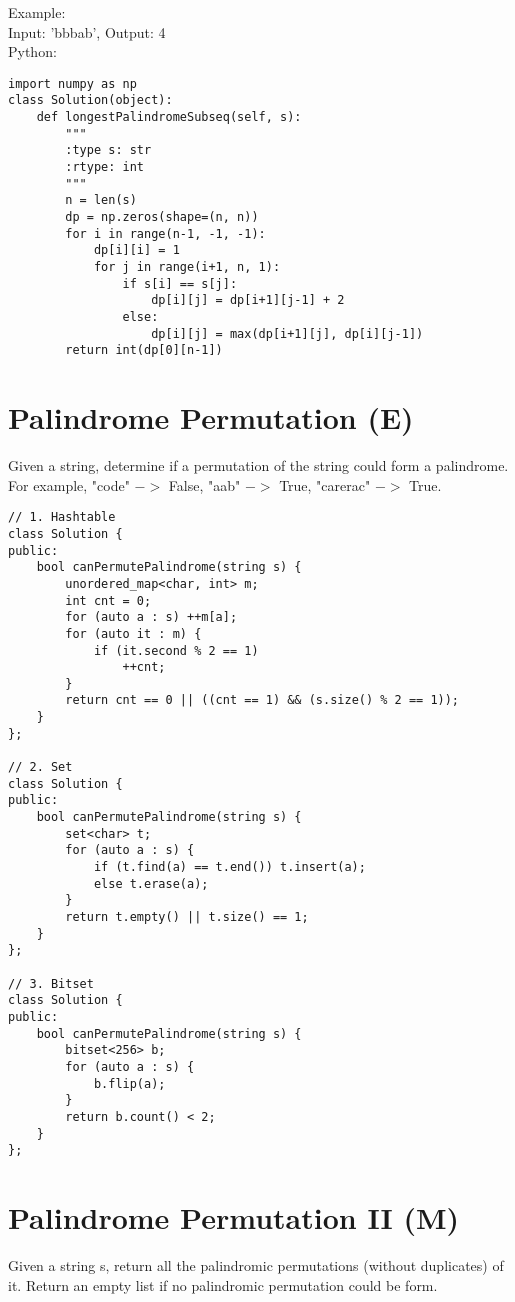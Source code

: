 Example:\\
Input: 'bbbab', Output: 4\\

Python:
\lstset{language=python}
\begin{lstlisting}
import numpy as np
class Solution(object):
    def longestPalindromeSubseq(self, s):
        """
        :type s: str
        :rtype: int
        """
        n = len(s)
        dp = np.zeros(shape=(n, n))
        for i in range(n-1, -1, -1):
            dp[i][i] = 1
            for j in range(i+1, n, 1):
                if s[i] == s[j]:
                    dp[i][j] = dp[i+1][j-1] + 2
                else: 
                    dp[i][j] = max(dp[i+1][j], dp[i][j-1])
        return int(dp[0][n-1])
\end{lstlisting}
\lstset{language=C++}

\section{Palindrome Permutation (E)}
Given a string, determine if a permutation of the string could form a palindrome.\\

For example, "code" $->$ False, "aab" $->$ True, "carerac" $->$ True.\\

\begin{lstlisting}
// 1. Hashtable
class Solution {
public:
    bool canPermutePalindrome(string s) {
        unordered_map<char, int> m;
        int cnt = 0;
        for (auto a : s) ++m[a];
        for (auto it : m) {
            if (it.second % 2 == 1)
                ++cnt;
        }
        return cnt == 0 || ((cnt == 1) && (s.size() % 2 == 1));
    }
};

// 2. Set
class Solution {
public:
    bool canPermutePalindrome(string s) {
        set<char> t;
        for (auto a : s) {
            if (t.find(a) == t.end()) t.insert(a);
            else t.erase(a);
        }
        return t.empty() || t.size() == 1;
    }
};

// 3. Bitset
class Solution {
public:
    bool canPermutePalindrome(string s) {
        bitset<256> b;
        for (auto a : s) {
            b.flip(a);
        }
        return b.count() < 2;
    }
};
\end{lstlisting}


\section{Palindrome Permutation II (M)}
Given a string s, return all the palindromic permutations (without duplicates) of it. Return an empty list if no palindromic permutation could be form.\\

